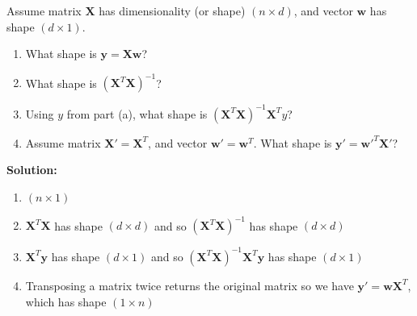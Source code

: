 \documentclass{harvardml}
\theoremstyle{definition}
\theoremstyle{plain}
\begin{document}
\begin{problem}
Assume matrix $\mathbf{X}$ has dimensionality (or shape) $(n \times d)$, and vector $\mathbf{w}$ has shape $(d \times 1)$.

\begin{enumerate}[label=(\alph*)]
		        
		        \item What shape is $\mathbf{y} =  \mathbf{X} \mathbf{w}$?
		        
		        \item What shape is $(\mathbf{X}^T \mathbf{X})^{-1}$?
		        
		        \item Using $y$ from part (a), what shape is $(\mathbf{X}^T \mathbf{X})^{-1} \mathbf{X}^T y$?
		        
		        \item Assume matrix $\mathbf{X}' = \mathbf{X}^T$, and vector $\mathbf{w}' = \mathbf{w}^T$.  What shape is $\mathbf{y}' = \mathbf{w}'^T \mathbf{X}'$?  

		    \end{enumerate}

\noindent \textbf{Solution:}
\begin{enumerate}[label=(\alph*)]
    \item $(n \times 1)$
    \item $\mathbf{X}^T\mathbf{X}$ has shape $(d \times d)$ and so $(\mathbf{X}^T\mathbf{X})^{-1}$ has shape $(d \times d)$
    \item $\mathbf{X}^T \mathbf{y}$ has shape $(d \times 1)$ and so $(\mathbf{X}^T\mathbf{X})^{-1}\mathbf{X}^T \mathbf{y}$ has shape $(d \times 1)$
    \item Transposing a matrix twice returns the original matrix so we have $\mathbf{y}' = \mathbf{w} \mathbf X^T$, which has shape $(1 \times n)$
\end{enumerate}
\end{problem}
\end{document}
